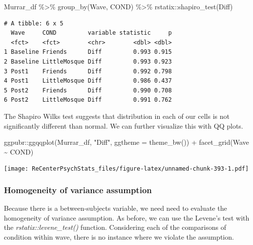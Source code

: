 \documentclass[
  11pt,
]{book}
\newenvironment{Shaded}{\begin{snugshade}}{\end{snugshade}}
\newcommand{\AttributeTok}[1]{\textcolor[rgb]{0.77,0.63,0.00}{#1}}
\newcommand{\FunctionTok}[1]{\textcolor[rgb]{0.00,0.00,0.00}{#1}}
\newcommand{\NormalTok}[1]{#1}
\newcommand{\SpecialCharTok}[1]{\textcolor[rgb]{0.00,0.00,0.00}{#1}}
\newcommand{\StringTok}[1]{\textcolor[rgb]{0.31,0.60,0.02}{#1}}
\begin{document}
\begin{Shaded}
\begin{Highlighting}[]
\NormalTok{Murrar\_df }\SpecialCharTok{\%\textgreater{}\%}
    \FunctionTok{group\_by}\NormalTok{(Wave, COND) }\SpecialCharTok{\%\textgreater{}\%}
\NormalTok{    rstatix}\SpecialCharTok{::}\FunctionTok{shapiro\_test}\NormalTok{(Diff)}
\end{Highlighting}
\end{Shaded}

\begin{verbatim}
# A tibble: 6 x 5
  Wave     COND         variable statistic     p
  <fct>    <fct>        <chr>        <dbl> <dbl>
1 Baseline Friends      Diff         0.993 0.915
2 Baseline LittleMosque Diff         0.993 0.923
3 Post1    Friends      Diff         0.992 0.798
4 Post1    LittleMosque Diff         0.986 0.437
5 Post2    Friends      Diff         0.990 0.708
6 Post2    LittleMosque Diff         0.991 0.762
\end{verbatim}

The Shapiro Wilks test suggests that distribution in each of our cells is not significantly different than normal. We can further visualize this with QQ plots.

\begin{Shaded}
\begin{Highlighting}[]
\NormalTok{ggpubr}\SpecialCharTok{::}\FunctionTok{ggqqplot}\NormalTok{(Murrar\_df, }\StringTok{"Diff"}\NormalTok{, }\AttributeTok{ggtheme =} \FunctionTok{theme\_bw}\NormalTok{()) }\SpecialCharTok{+} \FunctionTok{facet\_grid}\NormalTok{(Wave }\SpecialCharTok{\textasciitilde{}}
\NormalTok{    COND)}
\end{Highlighting}
\end{Shaded}

\texttt{[image: ReCenterPsychStats\_files/figure-latex/unnamed-chunk-393-1.pdf]}

\hypertarget{homogeneity-of-variance-assumption}{%
\subsubsection{Homogeneity of variance assumption}\label{homogeneity-of-variance-assumption}}

Because there is a between-subjects variable, we need need to evaluate the homogeneity of variance assumption. As before, we can use the Levene's test with the \emph{rstatix::levene\_test()} function. Considering each of the comparisons of condition within wave, there is no instance where we violate the assumption.
\end{document}
